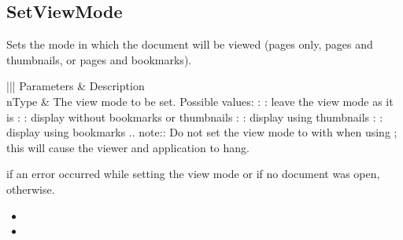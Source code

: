 \documentclass[letterpaper,12pt,english,openany,oneside]{sphinxmanual}
\begin{document}
\subsection{SetViewMode}
\label{\detokenize{IAC_API_OLE_Objects:setviewmode}}
Sets the mode in which the document will be viewed (pages only, pages and thumbnails, or pages and bookmarks).


\begin{sphinxVerbatim}[commandchars=\\\{\}]
  
\end{sphinxVerbatim}
\label{\detokenize{IAC_API_OLE_Objects:parameters-32}}


\begin{savenotes}\sphinxattablestart
\centering
{}\label{\detokenize{IAC_API_OLE_Objects:section-35}}\nobreak
\begin{tabular}[t]{|||}
\hline
\sphinxstyletheadfamily 
Parameters
&\sphinxstyletheadfamily 
Description
\\
\hline
nType
&
The view mode to be set. Possible values:  : : leave the view mode as it is  : : display without bookmarks or thumbnails  : : display using thumbnails  : : display using bookmarks  .. note::  Do not set the view mode to  with  when using  ; this will cause the viewer and application to hang.
\\
\hline
\end{tabular}
\par
\sphinxattableend\end{savenotes}


 if an error occurred while setting the view mode or if no document was open,  otherwise.

\label{\detokenize{IAC_API_OLE_Objects:related-methods-47}}
\begin{itemize}
\item {} 
 

\item {} 
 

\end{itemize}
\end{document}
